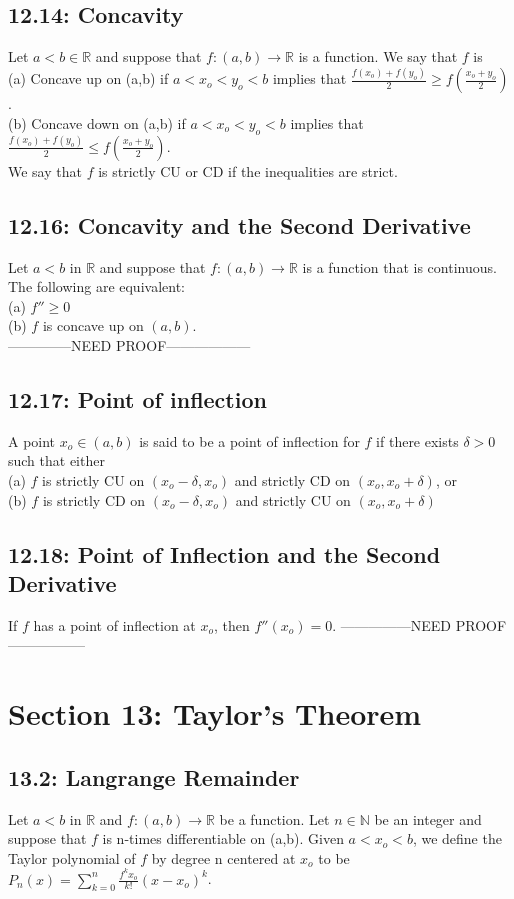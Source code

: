 \documentclass[10pt,letter]{report}
\begin{document}
\section*{12.14: Concavity}
Let $a<b\in\mathbb{R}$ and suppose that $f:(a,b)\rightarrow\mathbb{R}$ is a function. We say that $f$ is \\ 
(a) Concave up on (a,b) if $a<x_o<y_o<b$ implies that $\frac{f(x_o)+f(y_o)}{2}\geq f(\frac{x_o+y_o}{2})$. \\ 
(b) Concave down on (a,b) if $a<x_o<y_o<b$ implies that $\frac{f(x_o)+f(y_o)}{2}\leq f(\frac{x_o+y_o}{2})$. \\ 
We say that $f$ is strictly CU or CD if the inequalities are strict. 

\section*{12.16: Concavity and the Second Derivative}
Let $a<b$ in $\mathbb{R}$ and suppose that $f:(a,b)\rightarrow\mathbb{R}$ is a function that is continuous. The following are equivalent: \\ 
(a) $f''\geq0$\\ 
(b) $f$ is concave up on $(a,b)$. \\ 
--------------NEED PROOF------------------ 

\section*{12.17: Point of inflection}
A point $x_o\in(a,b)$ is said to be a point of inflection for $f$ if there exists $\delta>0$ such that either \\ 
(a) $f$ is strictly CU on $(x_o-\delta,x_o)$ and strictly CD on $(x_o,x_o+\delta)$, or \\ 
(b) $f$ is strictly CD on $(x_o-\delta,x_o)$ and strictly CU on $(x_o,x_o+\delta)$ 

\section*{12.18: Point of Inflection and the Second Derivative}
If $f$ has a point of inflection at $x_o$, then $f''(x_o)=0$. 
---------------NEED PROOF----------------- 



\chapter*{Section 13: Taylor's Theorem}
\section*{13.2: Langrange Remainder}
Let $a<b$ in $\mathbb{R}$ and $f:(a,b)\rightarrow\mathbb{R}$ be a function. Let $n\in\mathbb{N}$ be an integer and suppose that $f$ is n-times differentiable on (a,b). Given $a<x_o<b$, we define the Taylor polynomial of $f$ by degree n centered at $x_o$ to be $P_n(x)=\sum_{k=0}^n\frac{f^kx_o}{k!}(x-x_o)^k$. 
\end{document}
